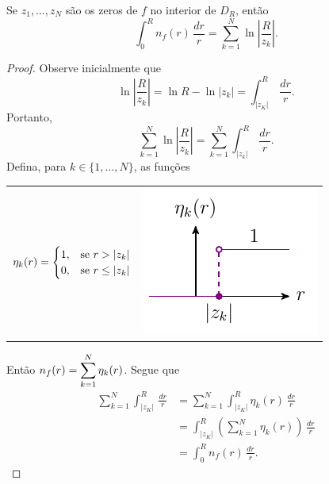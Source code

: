     \begin{corolario}
    \label{corol:num-zeros}
        Se $z_1, \dots, z_N$ são os zeros de $f$ no interior de $D_R$, então
        \begin{equation*}
            \int_{0}^{R}n_f(r) \, \frac{dr}{r} 
            = \sum_{k=1}^{N} \ln{\left |\frac{R}{z_k}\right|}.
        \end{equation*}
    \end{corolario}
    \begin{proof}
    Observe inicialmente que 
    \begin{equation*}
        \ln{\left |\frac{R}{z_k}\right|} = \ln{R} - \ln{|z_k|} 
        = \int_{|z_K|}^{R} \, \frac{dr}{r}.
    \end{equation*}
    Portanto, 
    \begin{equation*}
        \sum_{k=1}^{N}\ln{\left |\frac{R}{z_k}\right|} 
        = \sum_{k=1}^{N}\int_{|z_k|}^{R} \, \frac{dr}{r}.
    \end{equation*}
    Defina, para $k \in \{1, \dots, N\}$, as funções
    
    \begin{tabular}{%
    		@{}
    		m{}
    		@{}
    		m{}
    		@{}
    	}
    	\centering
    	$\displaystyle
    	\eta_k(r) = 
        \begin{cases}
            1, &\text{se } r > |z_k| \\
            0, &\text{se } r \leq |z_k|
        \end{cases}
    	$
    	&
    	\includegraphics{Figuras/função salto.pdf} 
    \end{tabular}
    
    Então $n_f(r) = \displaystyle{\sum_{k=1}^{N} \eta_k(r)}$. Segue que
    \begin{align*}
        \sum_{k=1}^{N}\int_{|z_K|}^{R} \, \frac{dr}{r} 
        &= \sum_{k=1}^{N}\int_{|z_K|}^{R}\eta_k(r) \, \frac{dr}{r} \\
        &= \int_{|z_K|}^{R}\left(\sum_{k=1}^{N}\eta_k(r)\right) \, \frac{dr}{r} \\
        &= \int_{0}^{R}n_f(r) \, \frac{dr}{r}.
    \end{align*}
    \end{proof}
